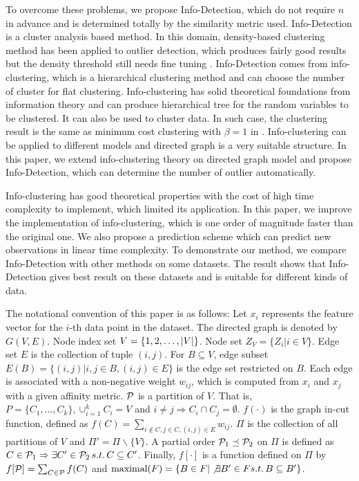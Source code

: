 \documentclass[runningheads]{llncs}
\begin{document}
To overcome these problems, we propose Info-Detection, which do not require $n$ in advance and is determined totally by the similarity metric used.  
Info-Detection is a cluster analysis based method. In this domain, density-based clustering method has been applied to outlier detection, which produces fairly good results but the density threshold still needs fine tuning \cite{Campello}. Info-Detection comes from info-clustering, which is a hierarchical clustering method \cite{RN1} and can choose the number of cluster for flat clustering. Info-clustering has solid theoretical foundations from information theory and can produce hierarchical tree for the random variables to be clustered. It can also be used to cluster data. In such case, the clustering result is the same as minimum cost clustering with $\beta = 1$ in \cite{RN7}. Info-clustering can be applied to different models and directed graph is a very suitable structure. In this paper, we extend info-clustering theory on directed graph model and propose Info-Detection, which can determine the number of outlier automatically.

Info-clustering has good theoretical properties with the cost of high time complexity to implement, which limited its application. In this paper, we improve the implementation of info-clustering, which is one order of magnitude faster than the original one. We also propose a prediction scheme which can predict new observations in linear time complexity. To demonstrate our method, we compare Info-Detection with other methods on some datasets. The result shows that Info-Detection gives best result on these datasets and is suitable for different kinds of data.

The notational convention of this paper is as follows: Let $x_i$ represents the feature vector for the $i$-th data point in the dataset. The directed graph is denoted by $G(V, E)$. Node index set $V=\{1, 2,\dots, \abs{V}\}$. Node set $Z_V=\{Z_i | i \in V\}$. Edge set $E$ is the collection of tuple $(i,j)$. For $B\subseteq V$, edge subset $E(B) = \{(i,j)| i, j \in B,(i,j)\in E\}$ is the edge set restricted on $B$. Each edge is associated with a non-negative weight $w_{ij}$, which is computed from $x_i$ and $x_j$ with a given affinity metric. $\P$ is a partition of $V$. That is, $P=\{C_1, \dots, C_k\}, \cup_{i=1}^k C_i=V$ and $i\neq j \Rightarrow C_i \cap C_j =\emptyset $. $f(\cdot)$ is the graph in-cut function, defined as $f(C)=\sum_{i \not\in C, j\in C, (i,j) \in E} w_{ij}$. $\Pi$ is the collection of all partitions of $V$ and $\Pi'=\Pi\backslash\{V\}$. A partial order $ \P_1 \preceq \P_2$ on $\Pi$ is defined as
$C \in \P_1 \Rightarrow \exists C' \in \P_2 \, s.t. \, C \subseteq C'$.
Finally, $f[\cdot]$ is a function defined on $\Pi$ by $f[\P]=\sum_{C\in \P}f(C)$ and $\textrm{maximal} (F)=\{B\in F | \not\exists B' \in F s.t.\, B \subseteq B'\}$.
\end{document}
